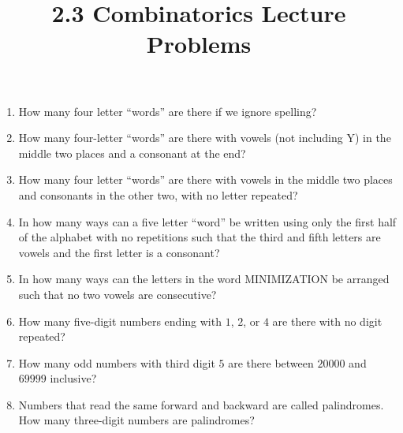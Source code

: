 \documentclass{article}
\title{2.3 Combinatorics Lecture Problems}
\author{}
\date{}
\begin{document}
\maketitle

\begin{enumerate}
	\item How many four letter ``words'' are there if we ignore spelling?
		\vspace{3cm}
	\item How many four-letter ``words'' are there with vowels (not including Y) in the middle two places and a consonant at the end?
		\vspace{3cm}
	\item How many four letter ``words'' are there with vowels in the middle two places and consonants in the other two, with no letter repeated?
		\vspace{3cm}
    \item In how many ways can a five letter ``word'' be written using only the first half of the alphabet with no repetitions such that the third and fifth letters are vowels and the first letter is a consonant?
		\vspace{3cm}
    \item In how many ways can the letters in the word MINIMIZATION be arranged such that no two vowels are consecutive?
		\vspace{3cm}
    \item How many five-digit numbers ending with $1$, $2$, or $4$ are there with no digit repeated?
        \vspace{3cm}
    \item How many odd numbers with third digit $5$ are there between $20000$ and $69999$ inclusive?
		\vspace{3cm}
    \item Numbers that read the same forward and backward are called palindromes.
	How many three-digit numbers are palindromes?
\end{enumerate}
\end{document}
